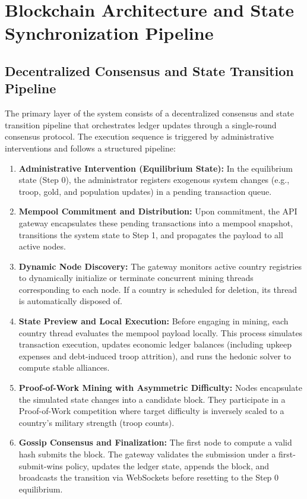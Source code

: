 \section{Blockchain Architecture and State Synchronization Pipeline}

\subsection{Decentralized Consensus and State Transition Pipeline}

The primary layer of the system consists of a decentralized consensus and state transition pipeline that orchestrates ledger updates through a single-round consensus protocol. The execution sequence is triggered by administrative interventions and follows a structured pipeline:

\begin{enumerate}
    \item \textbf{Administrative Intervention (Equilibrium State):} In the equilibrium state (Step 0), the administrator registers exogenous system changes (e.g., troop, gold, and population updates) in a pending transaction queue.
    
    \item \textbf{Mempool Commitment and Distribution:} Upon commitment, the API gateway encapsulates these pending transactions into a mempool snapshot, transitions the system state to Step 1, and propagates the payload to all active nodes.
    
    \item \textbf{Dynamic Node Discovery:} The gateway monitors active country registries to dynamically initialize or terminate concurrent mining threads corresponding to each node. If a country is scheduled for deletion, its thread is automatically disposed of.
    
    \item \textbf{State Preview and Local Execution:} Before engaging in mining, each country thread evaluates the mempool payload locally. This process simulates transaction execution, updates economic ledger balances (including upkeep expenses and debt-induced troop attrition), and runs the hedonic solver to compute stable alliances.
    
    \item \textbf{Proof-of-Work Mining with Asymmetric Difficulty:} Nodes encapsulate the simulated state changes into a candidate block. They participate in a Proof-of-Work competition where target difficulty is inversely scaled to a country's military strength (troop counts).
    
    \item \textbf{Gossip Consensus and Finalization:} The first node to compute a valid hash submits the block. The gateway validates the submission under a first-submit-wins policy, updates the ledger state, appends the block, and broadcasts the transition via WebSockets before resetting to the Step 0 equilibrium.
\end{enumerate}



